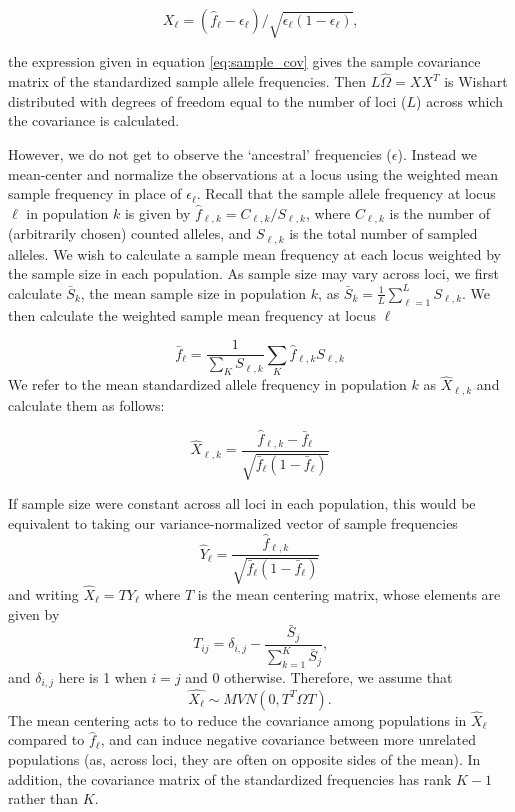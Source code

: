 \documentclass[12pt]{article}
\begin{document}
\begin{equation}
X_\ell = (\hat{f}_{\ell}  - \epsilon_{\ell})/\sqrt{\epsilon_{\ell}(1-\epsilon_{\ell})}\text{,}
\end{equation}

the expression given in equation \eqref{eq:sample_cov} gives the sample covariance matrix of the standardized sample allele frequencies. Then $L\widehat{\Omega} = X X^T$  is Wishart distributed with degrees of freedom equal to the number of loci ($L$) across which the covariance is calculated. 

However, we do not get to observe the `ancestral' frequencies ($\epsilon$). 
Instead we mean-center and normalize the observations at a locus using the weighted mean sample frequency in place of $\epsilon_{\ell}$.
Recall that the sample allele frequency at locus $\ell$ in population $k$ is given by $\hat{f}_{\ell,k} = C_{\ell,k}/S_{\ell,k}$,  
where $C_{\ell,k}$ is the number of (arbitrarily chosen) counted alleles,
and $S_{\ell,k}$ is the total number of sampled alleles.
We wish to calculate a sample mean frequency at each locus weighted by the sample size in each population.  As sample size may vary across loci, we first calculate $\bar{S}_k$, the mean sample size in population $k$, as $\bar{S}_k = \frac{1}{L}\sum_{\ell=1}^L S_{\ell,k}$.  We then calculate the weighted sample mean frequency at locus $\ell$ 

\begin{equation}
\label{eq:sample_mean_freq}
\bar{f}_{\ell} = \frac{1}{\sum_K S_{\ell,k}} \sum_K \hat{f}_{\ell,k} S_{\ell,k}
\end{equation}
We refer to the mean standardized allele frequency in population $k$ as $\hat{X}_{\ell,k}$ and calculate them as follows:

\begin{equation}
\hat{X}_{\ell,k} = \frac{ \hat{f}_{\ell,k} - \bar{f}_{\ell} } {\sqrt{\bar{f}_{\ell}(1-\bar{f}_{\ell})}}
\end{equation}

If sample size were constant across all loci in each population, this would be equivalent to taking our variance-normalized vector of sample frequencies
\begin{equation}
\hat{Y}_{\ell} = \frac{ \hat{f}_{\ell,k} } {\sqrt{\bar{f}_{\ell}(1-\bar{f}_{\ell})}}
\end{equation}
and writing $\hat{X}_{\ell} = T Y_{\ell} $ where $T$ is the mean centering matrix, whose elements are given by
\begin{equation}
T_{ij} = \delta_{i,j}  -  \frac{\bar{S}_j}{\sum\limits_{k=1}^{K} \bar{S}_j	} \text{,}
\end{equation}
and $\delta_{i,j}$ here is 1 when $i=j$ and 0 otherwise.
Therefore, we assume that
\begin{equation}
\hat{X_{\ell}} \sim MVN(0, T^T \Omega T) \text{.}
\end{equation}
The mean centering acts to to reduce the covariance among populations in $\hat{X}_{\ell}$ compared to $\hat{f}_{\ell}$, and can induce negative covariance between more unrelated populations (as, across loci, they are often on opposite sides of the mean). In addition, the covariance matrix of the standardized frequencies has rank $K-1$ rather than $K$.
\end{document}
